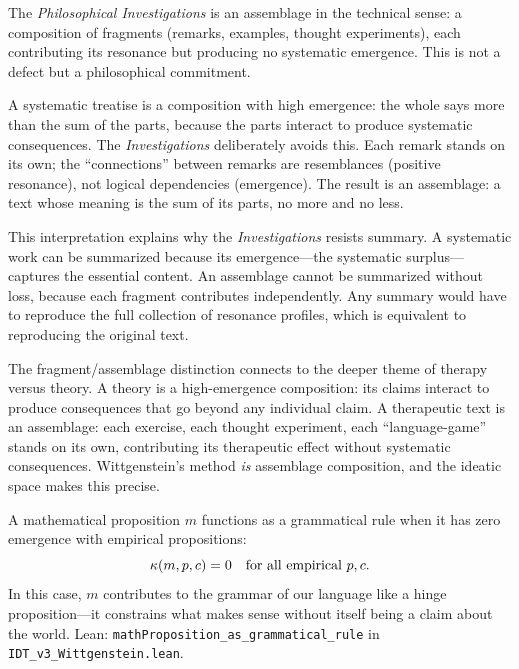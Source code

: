 \begin{interpretation}
The \textit{Philosophical Investigations} is an assemblage in the technical
sense: a composition of fragments (remarks, examples, thought experiments),
each contributing its resonance but producing no systematic emergence. This is
not a defect but a philosophical commitment.

A systematic treatise is a composition with high emergence: the whole says more
than the sum of the parts, because the parts interact to produce systematic
consequences. The \textit{Investigations} deliberately avoids this. Each
remark stands on its own; the ``connections'' between remarks are resemblances
(positive resonance), not logical dependencies (emergence). The result is an
assemblage: a text whose meaning is the sum of its parts, no more and no less.

This interpretation explains why the \textit{Investigations} resists summary.
A systematic work can be summarized because its emergence---the systematic
surplus---captures the essential content. An assemblage cannot be summarized
without loss, because each fragment contributes independently. Any summary
would have to reproduce the full collection of resonance profiles, which is
equivalent to reproducing the original text.

The fragment/assemblage distinction connects to the deeper theme of therapy
versus theory. A theory is a high-emergence composition: its claims interact
to produce consequences that go beyond any individual claim. A therapeutic
text is an assemblage: each exercise, each thought experiment, each
``language-game'' stands on its own, contributing its therapeutic effect
without systematic consequences. Wittgenstein's method \emph{is} assemblage
composition, and the ideatic space makes this precise.
\end{interpretation}

\begin{theorem}
\label{thm:math-proposition-grammatical}
A mathematical proposition $m$ functions as a grammatical rule when it has zero
emergence with empirical propositions:
\[
\kappa(m, p, c) = 0 \quad \text{for all empirical } p, c.
\]
In this case, $m$ contributes to the grammar of our language like a hinge
proposition---it constrains what makes sense without itself being a claim
about the world.
Lean: \texttt{mathProposition\_as\_grammatical\_rule} in
\texttt{IDT\_v3\_Wittgenstein.lean}.
\end{theorem}

